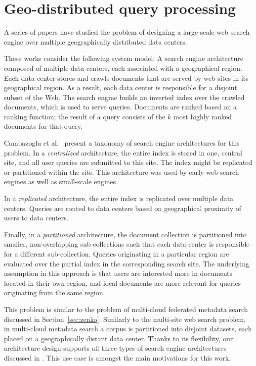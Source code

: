 \section{Geo-distributed query processing}
\label{sec:federation}

A series of papers \cite{cambazoglu:multisitequantifying, yates:multisitefeasibility, cambazoglu:multisiteforwarding, frances:multisiteefficiency, kayaaslan:multisitereplication}
have studied the problem of designing a large-scale web search engine over multiple geographically distributed data centers.

These works consider the following system model:
A search engine architecture composed of multiple data centers, each associated with a geographical region.
Each data center stores and crawls documents that are served by web sites in its geographical region.
As a result, each data center is responsible for a disjoint subset of the Web.
The search engine builds an inverted index over the crawled documents, which is used to serve queries.
Documents are ranked based on a ranking function; the result of a query consists of the $k$ most highly ranked documents
for that query.

Cambazoglu et al.\ \cite{cambazoglu:multisitequantifying} present a taxonomy of search engine architectures for this problem.
In a \textit{centralized} architecture, the entire index is stored in one, central site, and all user queries are submitted to this site.
The index might be replicated or partitioned within the site.
This architecture was used by early web search engines as well as small-scale engines.

In a \textit{replicated} architecture, the entire index is replicated over multiple data centers.
Queries are routed to data centers based on geographical proximity of users to data centers.

Finally, in a \textit{partitioned} architecture, the document collection is partitioned into smaller, non-overlapping
sub-collections such that each data center is responsible for a different sub-collection.
Queries originating in a particular region are evaluated over the partial index in the corresponding search site.
The underlying assumption in this approach is that users are interested more in documents located in their own region,
and local documents are more relevant for queries originating from the same region.

This problem is similar to the problem of multi-cloud federated metadata search discussed in Section~\ref{sec:zenko}.
Similarly to the multi-site web search problem,
in multi-cloud metadata search a corpus is partitioned into disjoint datasets, each placed on a geographically distant
data center.
Thanks to its flexibility, our architecture design supports all three types of search engine architectures discussed in
\cite{cambazoglu:multisitequantifying}.
This use case is amongst the main motivations for this work.

